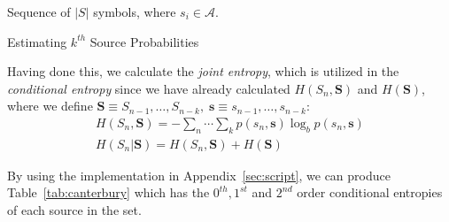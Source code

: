 \documentclass[a4paper, twocolumn]{article}
\begin{document}
        \begin{algorithm}
            \begin{algorithmic}
                \REQUIRE Sequence of \(|S|\) symbols,\: where \(s_i \in \mathcal{A}.\)
                    \ENDFOR
                \ENDFOR

                \ENDFOR
            \end{algorithmic}
            \caption{Estimating \(k^{th}\) Source Probabilities}
            \label{alg:entropy}
        \end{algorithm}

        Having done this, we calculate the \emph{joint entropy}, which is utilized in the \emph{conditional entropy} since we have already calculated \(H(S_n, \bm{S})\) and \(H(\bm{S})\), where we define \(\bm{S} \equiv S_{n-1}, \dots, S_{n-k},\; \bm{s} \equiv s_{n-1}, \dots, s_{n-k} \):
        \begin{gather} \label{eq:entropies}
            H(S_n, \bm{S}) = - \sum_n \cdots \sum_k p(s_n, \bm{s}) \log_b p(s_n, \bm{s}) \\
            H(S_n | \bm{S}) = H(S_n, \bm{S}) + H(\bm{S})
        \end{gather}

        By using the implementation in Appendix~\ref{sec:script}, we can produce Table~\ref{tab:canterbury} which has the \(0^{th}, 1^{st}\) and \(2^{nd}\) order conditional entropies of each source in the set.
\end{document}
